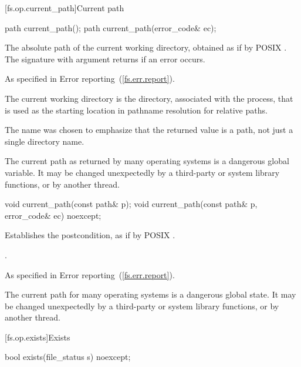 [fs.op.current_path]{Current path}

\begin{itemdecl}
path current_path();
path current_path(error_code& ec);
\end{itemdecl}

\begin{itemdescr}
\pnum
\returns The absolute path of the current working directory,
  obtained as if by POSIX .
  The signature with argument  returns  if an
  error occurs.

\pnum
\throws As specified in Error reporting~(\ref{fs.err.report}).

\pnum
\remarks The current working directory is the directory, associated
  with the process, that is used as the starting location in pathname resolution
  for relative paths.

\pnum
\enternote The  name was chosen to emphasize that the returned value is a
  path, not just a single directory name.

\pnum
The current path as returned by many operating systems is a dangerous
  global variable. It may be changed unexpectedly by a third-party or system
  library functions, or by another thread. \exitnote
\end{itemdescr}

\begin{itemdecl}
void current_path(const path& p);
void current_path(const path& p, error_code& ec) noexcept;
\end{itemdecl}

\begin{itemdescr}
\pnum
\effects Establishes the postcondition, as if by POSIX .

\pnum
\postcondition {}.

\pnum
\throws As specified in Error reporting~(\ref{fs.err.report}).

\pnum
\enternote The current path for many operating systems is a dangerous
  global state. It may be changed unexpectedly by a third-party or system
  library functions, or by another thread. \exitnote
\end{itemdescr}

[fs.op.exists]{Exists}

\begin{itemdecl}
bool exists(file_status s) noexcept;
\end{itemdecl}

